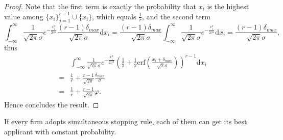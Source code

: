 \begin{proof}
    Note that the first term is exactly the probability that $x_i$ is the highest value among $\{x_i\}_{j=1}^{r-1} \cup \{x_i\}$, which equals $\frac{1}{r}$, and the second term
    \[\int_{-\infty}^{\infty} \frac{1}{\sqrt{2 \pi}\sigma} e^{-\frac{x_i^2}{2\sigma^2}}
        \frac{(r-1)\delta_{max}}{\sqrt{2\pi}\sigma}\mathrm{d} x_i
    = \frac{(r-1)\delta_{max}}{\sqrt{2\pi}\sigma}
    \int_{-\infty}^{\infty} \frac{1}{\sqrt{2 \pi}\sigma} e^{-\frac{x_i^2}{2\sigma^2}} \mathrm{d} x_i
    = \frac{(r-1)\delta_{max}}{\sqrt{2\pi}\sigma},\]
    thus
    \begin{align*}
    & \int_{-\infty}^{\infty} \frac{1}{\sqrt{2 \pi}\sigma} e^{-\frac{x_i^2}{2\sigma^2}}
        (\frac{1}{2} + \frac{1}{2}\mathrm{erf}(\frac{x_i + \delta_{max}}{\sqrt{2}\sigma}))^{r-1} \mathrm{d} x_i \\
    = &\frac{1}{r} + \frac{r-1}{\sqrt{2\pi}} \frac{\delta_{max}}{\sigma} \\
    = &\frac{1}{r} + \frac{r - 1}{\sqrt{2\pi}} \varphi.
    \end{align*}
    Hence concludes the result.

\end{proof}

\begin{lemma} \label{cplem}
If every firm adopts simultaneous stopping rule, each of them can get
its best applicant with constant probability.
\end{lemma}

